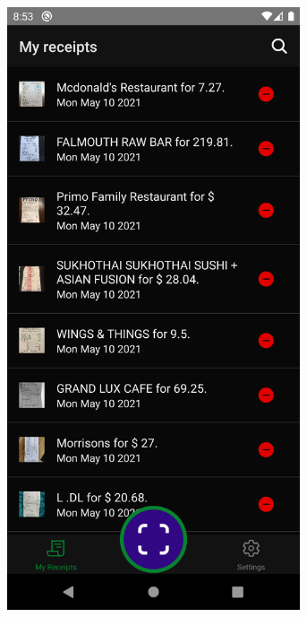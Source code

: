 \documentclass[
  digital, %
  table,   %
  oneside, %
  lof,     %
  lot,     %
]{fithesis3}
\newcommand\half{0.45}
\newcommand\subfigsize{0.95}
\begin{document}
\begin{figure}
    \centering
    \begin{subfigure}[t]{\half\textwidth}
      \centering
      \includegraphics[width=\subfigsize\textwidth]{figures/screens/android/dark/receipts_list}

\end{subfigure}
\end{figure}
\end{document}
